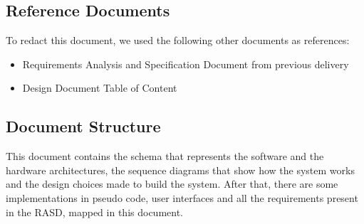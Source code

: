 \subsection{Reference Documents}
	To redact this document, we used the following other documents as references:
	\begin{itemize}
		\item Requirements Analysis and Specification Document from previous delivery
		\item Design Document Table of Content 
	\end{itemize}
\subsection{Document Structure}
	This document contains the schema that represents the software and the hardware architectures, the sequence diagrams that show how the system works and the design choices made to build the system. After that, there are some implementations in pseudo code, user interfaces and all the requirements present in the RASD, mapped in this document.